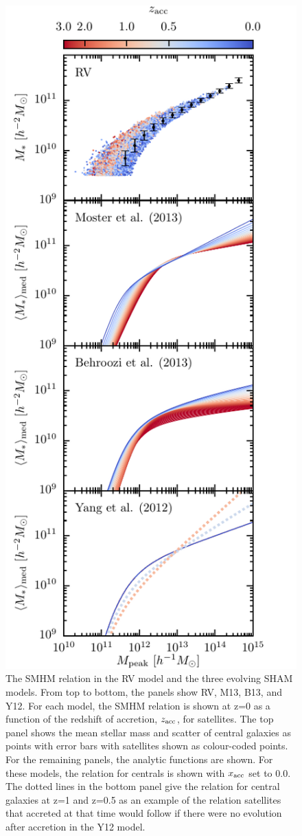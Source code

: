 \documentclass[a4paper,fleqn,usenatbib]{mnras}
\begin{document}
\begin{figure}
    \includegraphics{figures/SMHM_comparison.pdf}
    \caption{The SMHM relation in the RV model and the three evolving SHAM models.  From top to bottom, the panels show RV, M13, B13, and Y12.  For each model, the SMHM relation is shown at z=0 as a function of the redshift of accretion, $z_{\rm acc}$, for satellites.  The top panel shows the mean stellar mass and scatter of central galaxies as points with error bars with satellites shown as colour-coded points.  For the remaining panels, the analytic functions are shown. For these models, the relation for centrals is shown with $x_{\rm acc}$ set to $0.0$.  The dotted lines in the bottom panel give the relation for central galaxies at z=1 and z=0.5 as an example of the relation satellites that accreted at that time would follow if there were no evolution after accretion in the Y12 model.}

\end{figure}
\end{document}
